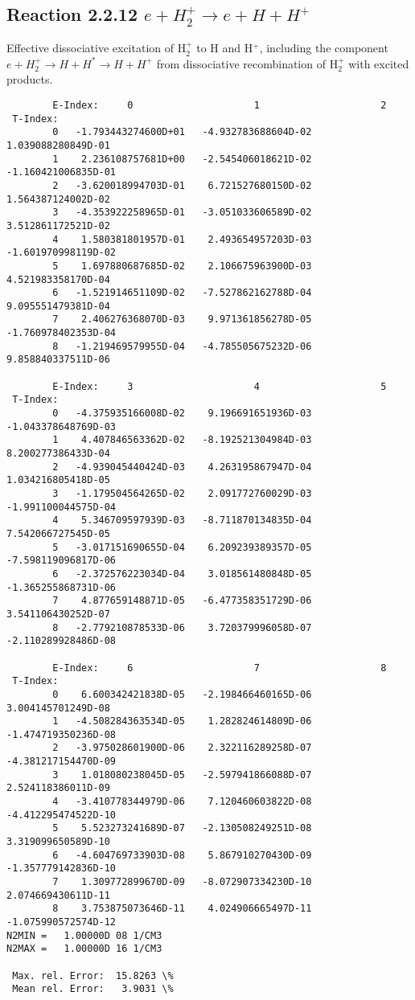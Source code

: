 \documentclass[12pt,dvipdfmx]{article}
\begin{document}
\subsection{
Reaction 2.2.12 $  e + H_2^+   \rightarrow  e + H + H^+  $
}
Effective dissociative excitation of H$_2^+$ to H and H$^+$, including the
component $e+H_2^+ \rightarrow H + H^* \rightarrow H + H^+$ from dissociative recombination of H$_2^+$ with excited products.

\begin{small}\begin{verbatim}
        E-Index:     0                     1                     2
 T-Index:
        0   -1.793443274600D+01   -4.932783688604D-02    1.039088280849D-01
        1    2.236108757681D+00   -2.545406018621D-02   -1.160421006835D-01
        2   -3.620018994703D-01    6.721527680150D-02    1.564387124002D-02
        3   -4.353922258965D-01   -3.051033606589D-02    3.512861172521D-02
        4    1.580381801957D-01    2.493654957203D-03   -1.601970998119D-02
        5    1.697880687685D-02    2.106675963900D-03    4.521983358170D-04
        6   -1.521914651109D-02   -7.527862162788D-04    9.095551479381D-04
        7    2.406276368070D-03    9.971361856278D-05   -1.760978402353D-04
        8   -1.219469579955D-04   -4.785505675232D-06    9.858840337511D-06

        E-Index:     3                     4                     5
 T-Index:
        0   -4.375935166008D-02    9.196691651936D-03   -1.043378648769D-03
        1    4.407846563362D-02   -8.192521304984D-03    8.200277386433D-04
        2   -4.939045440424D-03    4.263195867947D-04    1.034216805418D-05
        3   -1.179504564265D-02    2.091772760029D-03   -1.991100044575D-04
        4    5.346709597939D-03   -8.711870134835D-04    7.542066727545D-05
        5   -3.017151690655D-04    6.209239389357D-05   -7.598119096817D-06
        6   -2.372576223034D-04    3.018561480848D-05   -1.365255868731D-06
        7    4.877659148871D-05   -6.477358351729D-06    3.541106430252D-07
        8   -2.779210878533D-06    3.720379996058D-07   -2.110289928486D-08

        E-Index:     6                     7                     8
 T-Index:
        0    6.600342421838D-05   -2.198466460165D-06    3.004145701249D-08
        1   -4.508284363534D-05    1.282824614809D-06   -1.474719350236D-08
        2   -3.975028601900D-06    2.322116289258D-07   -4.381217154470D-09
        3    1.018080238045D-05   -2.597941866088D-07    2.524118386011D-09
        4   -3.410778344979D-06    7.120460603822D-08   -4.412295474522D-10
        5    5.523273241689D-07   -2.130508249251D-08    3.319099650589D-10
        6   -4.604769733903D-08    5.867910270430D-09   -1.357779142836D-10
        7    1.309772899670D-09   -8.072907334230D-10    2.074669430611D-11
        8    3.753875073646D-11    4.024906665497D-11   -1.075990572574D-12
N2MIN =   1.00000D 08 1/CM3
N2MAX =   1.00000D 16 1/CM3

 Max. rel. Error:  15.8263 \%
 Mean rel. Error:   3.9031 \%

\end{verbatim}\end{small}
\end{document}
